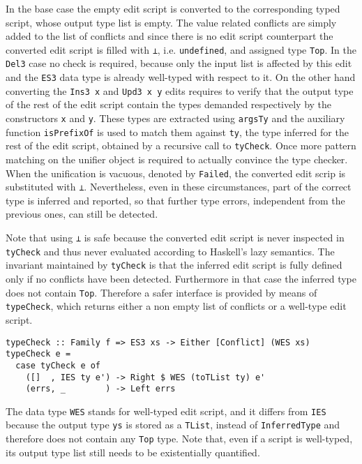 \documentclass[../Thesis.tex]{subfiles}
\begin{document}
	In the base case the empty edit script is converted to the corresponding
	typed script, whose output type list is empty.
	The value related conflicts are simply added to the list of conflicts
	and since there is no edit script counterpart the converted edit script
	is filled with \texttt{⊥}, i.e. \texttt{undefined}, and assigned type 
	\texttt{Top}. In the \texttt{Del3} case no check is required, because
	only the input list is affected by this edit and the \texttt{ES3} data type is 
	already well-typed with respect to it.
	On the other hand converting the \texttt{Ins3 x} and \texttt{Upd3 x y} edits
	requires to verify that the output type of the rest of the edit script 
	contain the types demanded respectively by the constructors \texttt{x} and 
	\texttt{y}. These types are extracted using \texttt{argsTy} and the
	auxiliary function \texttt{isPrefixOf} is used to match them
	against \texttt{ty}, the type inferred for the rest of the edit script, obtained
	by a recursive call to \texttt{tyCheck}.
	Once more pattern matching on the unifier object is required to actually
	convince the type checker. When the unification is vacuous,
	denoted by \texttt{Failed}, the converted edit scrip is substituted with
	\texttt{⊥}. Nevertheless, even in these circumstances, part of the correct 
	type 	is inferred and reported, so that further type errors, independent
	from the previous ones, can still be detected.	
	
	Note that using \texttt{⊥} is safe because the converted edit script is 
	never inspected in \texttt{tyCheck} and thus never evaluated according to
	Haskell's lazy semantics.
	The invariant maintained by \texttt{tyCheck} is that the inferred edit
	script is fully defined only if no conflicts have been detected. Furthermore
	in that case the inferred type does not contain \texttt{Top}.
	Therefore a safer interface is provided by means of \texttt{typeCheck},
	which returns either a non empty list of conflicts or a well-type edit script.
	
\begin{verbatim}
typeCheck :: Family f => ES3 xs -> Either [Conflict] (WES xs)
typeCheck e =
  case tyCheck e of
    ([]  , IES ty e') -> Right $ WES (toTList ty) e'
    (errs, _        ) -> Left errs
\end{verbatim}

	The data type \texttt{WES} stands for well-typed edit script, and it differs
	from \texttt{IES} because the output type \texttt{ys} is stored as a
	\texttt{TList}, instead of \texttt{InferredType} and therefore
	does not contain any \texttt{Top} type.
	Note that, even if a script is well-typed, its output type list still needs 
	to be existentially quantified.
	
\end{document}
